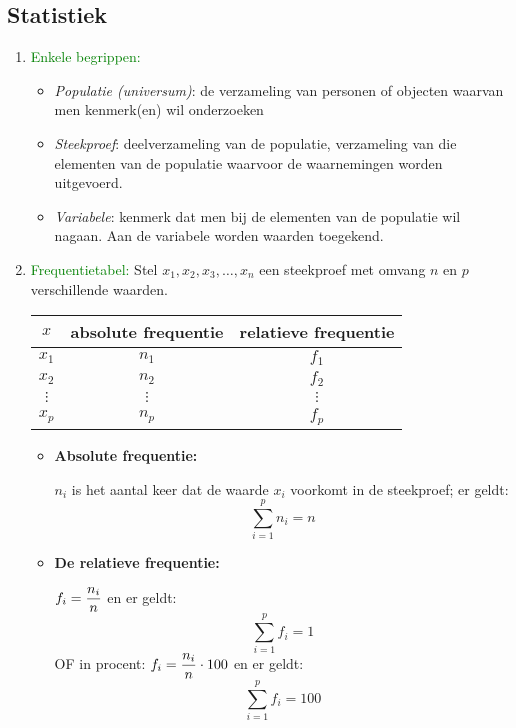 \subsection{Statistiek} \label{statistiek}
\hypertarget{statistiek}{}
\begin{enumerate}%
\item\textcolor{green}{\hypertarget{begrippen}{Enkele begrippen:}}\label{begrippen}
\begin{itemize}%
\item {\it Populatie (universum)}: de verzameling van personen of objecten waarvan men 						kenmerk(en) wil onderzoeken
\item {\it Steekproef}: deelverzameling van de populatie, verzameling van die elementen van de 			populatie waarvoor de waarnemingen worden uitgevoerd.
\item {\it Variabele}: kenmerk dat men bij de elementen van de populatie wil nagaan. Aan de   				variabele worden waarden toegekend.  
\end{itemize}%
\item\textcolor{green}{\hypertarget{frequentietabel}{Frequentietabel:}}\label{frequentietabel}\newline
Stel $x_1, x_2, x_3, \ldots, x_n$ een steekproef met omvang $n$ en $p$ verschillende waarden.
\begin{center}
\begin{tabular}{|c|c|c|}
\hline
$x$ & absolute frequentie & relatieve frequentie\\ \hline
$x_1$ & $n_1$ & $f_1$ \\
$x_2$ & $n_2$ & $f_2$ \\
$\vdots$ & $ \vdots$ & $\vdots$\\
$x_p$ & $n_p$ & $f_p$ \\
\hline
\end{tabular}
\end{center}
\begin{itemize}
\item \hypertarget{absolute_frequentie}{{\bf Absolute frequentie:}}\label{absolute_frequentie} $n_i$ is het aantal keer dat de waarde $x_i$ voorkomt in de steekproef; er geldt:\vskip 0.5cm
\[\sum_{i=1}^{p}{n_i}=n\]
\item \hypertarget{relatieve_frequentie}{{\bf De relatieve frequentie:}}\label{relatieve_frequentie} $f_i=\displaystyle\frac{\displaystyle n_i}{\displaystyle n}$ en er geldt:
 \[\sum_{i=1}^{p}{f_i}=1\]
OF in procent: $f_i=\displaystyle\frac{\displaystyle n_i}{\displaystyle n}\cdot 100$ en er geldt:
\[\sum_{i=1}^{p}{f_i}=100\]
\end{itemize}

\end{enumerate}
